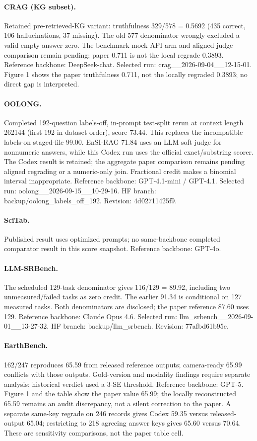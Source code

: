 \paragraph{CRAG (KG subset).} Retained pre-retrieved-KG variant: truthfulness 329/578 = 0.5692 (435 correct, 106 hallucinations, 37 missing). The old 577 denominator wrongly excluded a valid empty-answer zero. The benchmark mock-API arm and aligned-judge comparison remain pending; paper 0.711 is not the local regrade 0.3893. Reference backbone: DeepSeek-chat. Selected run: crag\_\_2026-09-04\_\_12-15-01. Figure 1 shows the paper truthfulness 0.711, not the locally regraded 0.3893; no direct gap is interpreted.
\paragraph{OOLONG.} Completed 192-question labels-off, in-prompt test-split rerun at context length 262144 (first 192 in dataset order), score 73.44. This replaces the incompatible labels-on staged-file 99.00. EnSI-RAG 71.84 uses an LLM soft judge for nonnumeric answers, while this Codex run uses the official exact/substring scorer. The Codex result is retained; the aggregate paper comparison remains pending aligned regrading or a numeric-only join. Fractional credit makes a binomial interval inappropriate. Reference backbone: GPT-4.1-mini / GPT-4.1. Selected run: oolong\_\_2026-09-15\_\_10-29-16. HF branch: backup/oolong\_labels\_off\_192. Revision: 4d02711425f9.
\paragraph{SciTab.} Published result uses optimized prompts; no same-backbone completed comparator result in this score snapshot. Reference backbone: GPT-4o.
\paragraph{LLM-SRBench.} The scheduled 129-task denominator gives 116/129 = 89.92, including two unmeasured/failed tasks as zero credit. The earlier 91.34 is conditional on 127 measured tasks. Both denominators are disclosed; the paper reference 87.60 uses 129. Reference backbone: Claude Opus 4.6. Selected run: llm\_srbench\_\_2026-09-01\_\_13-27-32. HF branch: backup/llm\_srbench. Revision: 77afbd61b95e.
\paragraph{EarthBench.} 162/247 reproduces 65.59 from released reference outputs; camera-ready 65.99 conflicts with those outputs. Gold-version and modality findings require separate analysis; historical verdict used a 3-SE threshold. Reference backbone: GPT-5. Figure 1 and the table show the paper value 65.99; the locally reconstructed 65.59 remains an audit discrepancy, not a silent correction to the paper. A separate same-key regrade on 246 records gives Codex 59.35 versus released-output 65.04; restricting to 218 agreeing answer keys gives 65.60 versus 70.64. These are sensitivity comparisons, not the paper table cell.
